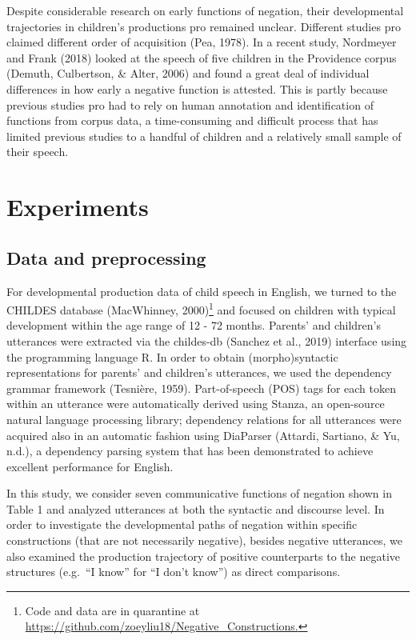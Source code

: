 \documentclass[
  english,
  man,floatsintext]{apa6}
\begin{document}
Despite considerable research on early functions of negation, their developmental trajectories in children's productions pro remained unclear. Different studies pro claimed different order of acquisition (Pea, 1978). In a recent study, Nordmeyer and Frank (2018) looked at the speech of five children in the Providence corpus (Demuth, Culbertson, \& Alter, 2006) and found a great deal of individual differences in how early a negative function is attested. This is partly because previous studies pro had to rely on human annotation and identification of functions from corpus data, a time-consuming and difficult process that has limited previous studies to a handful of children and a relatively small sample of their speech.

\clearpage

\hypertarget{experiments}{%
\section{Experiments}\label{experiments}}

\hypertarget{data-and-preprocessing}{%
\subsection{Data and preprocessing}\label{data-and-preprocessing}}

For developmental production data of child speech in English, we turned to the CHILDES database (MacWhinney, 2000)\footnote{Code and data are in quarantine at \url{https://github.com/zoeyliu18/Negative_Constructions.}} and focused on children with typical development within the age range of 12 - 72 months. Parents' and children's utterances were extracted via the childes-db (Sanchez et al., 2019) interface using the programming language R. In order to obtain (morpho)syntactic representations for parents' and children's utterances, we used the dependency grammar framework (Tesnière, 1959). Part-of-speech (POS) tags for each token within an utterance were automatically derived using Stanza, an open-source natural language processing library; dependency relations for all utterances were acquired also in an automatic fashion using DiaParser (Attardi, Sartiano, \& Yu, n.d.), a dependency parsing system that has been demonstrated to achieve excellent performance for English.

In this study, we consider seven communicative functions of negation shown in Table 1 and analyzed utterances at both the syntactic and discourse level.
In order to investigate the developmental paths of negation within specific constructions (that are not necessarily negative), besides negative utterances, we also examined the production trajectory of positive counterparts to the negative structures (e.g.~``I know'' for ``I don't know'') as direct comparisons.
\end{document}
